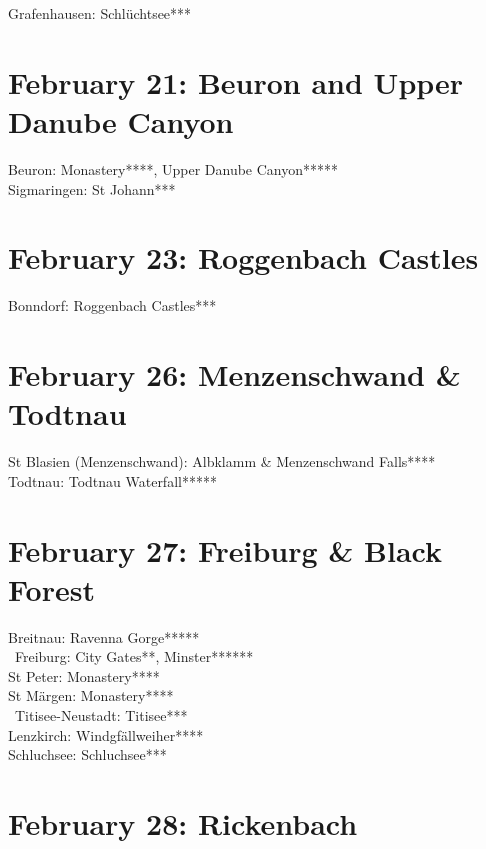Grafenhausen: Schl\"uchtsee***

\section{February 21: Beuron and Upper Danube Canyon}
\label{2021:Beuron}

Beuron: Monastery****, Upper Danube Canyon*****\\
Sigmaringen: St Johann***

\section{February 23: Roggenbach Castles}
\label{2021:Roggenbach}

Bonndorf: Roggenbach Castles***

\section{February 26: Menzenschwand \& Todtnau}
\label{2021:Todtnau}

St Blasien (Menzenschwand): Albklamm \& Menzenschwand Falls****\\
Todtnau: Todtnau Waterfall*****

\section{February 27: Freiburg \& Black Forest}
\label{2021:Freiburg}

Breitnau: Ravenna Gorge*****\\\
Freiburg: City Gates**, Minster******\\
St Peter: Monastery****\\
St M\"argen: Monastery****\\\
Titisee-Neustadt: Titisee***\\
Lenzkirch: Windgf\"allweiher****\\
Schluchsee: Schluchsee***

\section{February 28: Rickenbach}
\label{2021:Rickenbach}

